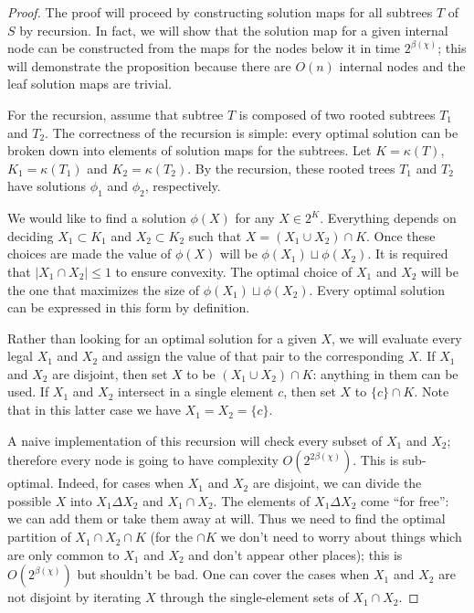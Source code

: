 \documentclass{amsart}
\newcommand{\col}{\chi}
\newcommand{\symmdiff}{\Delta}
\newcommand{\cut}{\kappa}
\newcommand{\bad}{\beta}
\begin{document}
\begin{proof}

The proof will proceed by constructing solution maps for all subtrees $T$ of $S$ by recursion.
In fact, we will show that the solution map for a given internal node can be constructed from the maps for the nodes below it in time $2^{\bad(\col)}$;
this will demonstrate the proposition because there are $O(n)$ internal nodes and the leaf solution maps are trivial.

For the recursion, assume that subtree $T$ is composed of two rooted subtrees $T_1$ and $T_2$.
The correctness of the recursion is simple: every optimal solution can be broken down into elements of solution maps for the subtrees.
Let $K = \cut(T)$, $K_1 = \cut(T_1)$ and $K_2 = \cut(T_2)$.
By the recursion, these rooted trees $T_1$ and $T_2$ have solutions $\phi_1$ and $\phi_2$, respectively.

We would like to find a solution $\phi(X)$ for any $X \in 2^K$.
Everything depends on deciding $X_1 \subset K_1$ and $X_2 \subset K_2$ such that $X = (X_1 \cup X_2) \cap K$.
Once these choices are made the value of $\phi(X)$ will be $\phi(X_1) \sqcup \phi(X_2)$.
It is required that $|X_1 \cap X_2| \leq 1$ to ensure convexity.
The optimal choice of $X_1$ and $X_2$ will be the one that maximizes the size of $\phi(X_1) \sqcup \phi(X_2)$.
Every optimal solution can be expressed in this form by definition.

Rather than looking for an optimal solution for a given $X$, we will evaluate every legal $X_1$ and $X_2$ and assign the value of that pair to the corresponding $X$.
If $X_1$ and $X_2$ are disjoint, then set $X$ to be $(X_1 \cup X_2) \cap K$: anything in them can be used.
If $X_1$ and $X_2$ intersect in a single element $c$, then set $X$ to $\{c\} \cap K$.
Note that in this latter case we have $X_1 = X_2 = \{c\}$.

A naive implementation of this recursion will check every subset of $X_1$ and $X_2$; therefore every node is going to have complexity $O(2^{2 \bad(\col)})$.
This is sub-optimal.
Indeed, for cases when $X_1$ and $X_2$ are disjoint, we can divide the possible $X$ into $X_1 \symmdiff X_2$ and $X_1 \cap X_2$.
The elements of $X_1 \symmdiff X_2$ come ``for free'': we can add them or take them away at will.
Thus we need to find the optimal partition of $X_1 \cap X_2 \cap K$ (for the $\cap K$ we don't need to worry about things which are only common to $X_1$ and $X_2$ and don't appear other places); this is $O(2^{\bad(\col)})$ but shouldn't be bad.
One can cover the cases when $X_1$ and $X_2$ are not disjoint by iterating $X$ through the single-element sets of $X_1 \cap X_2$.

\end{proof}
\end{document}
